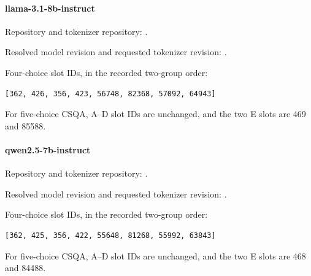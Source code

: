 \noindent\begin{minipage}{\textwidth}
\paragraph{llama-3.1-8b-instruct}

Repository and tokenizer repository: .

\par Resolved model revision and requested tokenizer revision: .

\par Four-choice slot IDs, in the recorded two-group order:

{\small\begin{verbatim}
[362, 426, 356, 423, 56748, 82368, 57092, 64943]
\end{verbatim}}

For five-choice CSQA, A--D slot IDs are unchanged, and the two E slots are 469 and 85588.
\end{minipage}\par\medskip

\noindent\begin{minipage}{\textwidth}
\paragraph{qwen2.5-7b-instruct}

Repository and tokenizer repository: .

\par Resolved model revision and requested tokenizer revision: .

\par Four-choice slot IDs, in the recorded two-group order:

{\small\begin{verbatim}
[362, 425, 356, 422, 55648, 81268, 55992, 63843]
\end{verbatim}}

For five-choice CSQA, A--D slot IDs are unchanged, and the two E slots are 468 and 84488.
\end{minipage}\par\medskip


